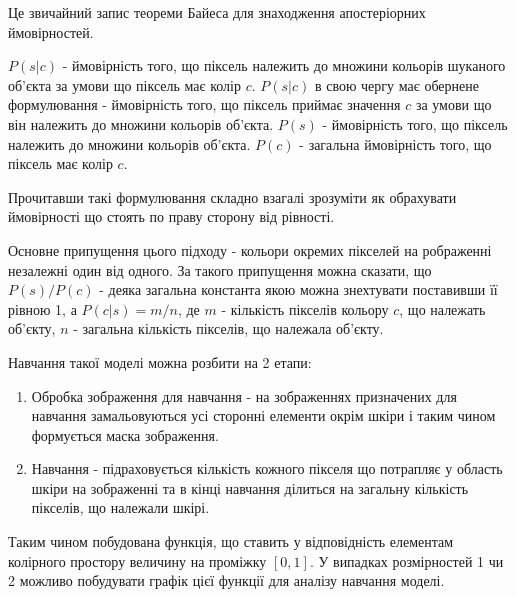 Це звичайний запис теореми Байеса для знаходження апостеріорних ймовірностей.

$P(s|c)$ - ймовірність того, що піксель належить до множини кольорів шуканого об'єкта за умови що піксель має колір $c$. $P(s|c)$ в свою чергу має обернене формулювання - ймовірність того, що піксель приймає значення $c$ за умови що він належить до множини кольорів об'єкта.
$P(s)$ - ймовірність того, що піксель належить до множини кольорів об'єкта. $P(c)$ - загальна ймовірність того, що піксель має колір $c$.

Прочитавши такі формулювання складно взагалі зрозуміти як обрахувати ймовірності що стоять по праву сторону від рівності.

Основне припущення цього підходу - кольори окремих пікселей на рображенні незалежні один від одного. За такого припущення можна сказати, що $P(s)/P(c)$ - деяка загальна константа якою можна знехтувати поставивши її рівною 1, а $P(c|s) = m/n$, де $m$ - кількість пікселів кольору $c$, що належать об'єкту, $n$ - загальна кількість пікселів, що належала об'єкту.

Навчання такої моделі можна розбити на 2 етапи:
\begin{enumerate}
	\item Обробка зображення для навчання - на зображеннях призначених для навчання замальовуються усі сторонні елементи окрім шкіри і таким чином формується маска зображення.
	\item Навчання - підраховується кількість кожного пікселя що потрапляє у область шкіри на зображенні та в кінці навчання ділиться на загальну кількість пікселів, що належали шкірі.
\end{enumerate}

Таким чином побудована функція, що ставить у відповідність елементам колірного простору величину на проміжку $[0,1]$. У випадках розмірностей 1 чи 2 можливо побудувати графік цієї функції для аналізу навчання моделі.